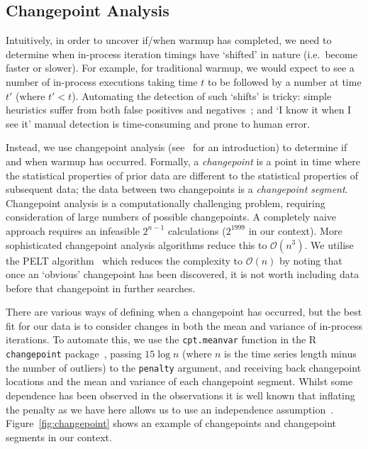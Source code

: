 \documentclass[acmsmall]{acmart}\settopmatter{printfolios=true}
\begin{document}
\subsection{Changepoint Analysis}

Intuitively, in order to uncover if/when warmup has completed, we need to
determine when in-process iteration timings have `shifted' in nature (i.e.~become
faster or slower). For example, for traditional warmup, we would expect to see a
number of in-process executions taking time $t$ to be followed by a number at
time $t'$ (where $t' < t$). Automating the detection of such `shifts' is
tricky: simple heuristics suffer from both false positives and negatives~\cite{kalibera13rigorous}; and
`I know it when I see it' manual detection is time-consuming and prone to human
error.

Instead, we use changepoint analysis (see~\citet{eckley11analysis} for an
introduction) to determine if and when warmup has occurred. Formally, a
\emph{changepoint} is a point in time where the statistical properties of prior
data are different to the statistical properties of subsequent data; the data
between two changepoints is a \emph{changepoint segment}.
Changepoint analysis is a computationally challenging problem, requiring
consideration of large numbers of possible changepoints. A completely naive
approach requires an infeasible $2^{n-1}$ calculations ($2^{1999}$ in our context).
More sophisticated changepoint analysis algorithms reduce this to $\mathcal{O}(n^3)$.
We utilise the PELT algorithm~\cite{killick12optimal} which reduces the
complexity to $\mathcal{O}(n)$ by noting that once an
`obvious' changepoint has been discovered, it is not worth including
data before that changepoint in further searches. 

There are various ways of defining when a changepoint has occurred, but the best fit
for our data is to consider changes in both the mean and variance of in-process
iterations. To automate this, we use the \texttt{cpt.meanvar} function in the R
\texttt{changepoint} package~\cite{killick14changepoint}, passing $15\log{n}$ (where
$n$ is the time series length minus the number of outliers) to the
\texttt{penalty} argument, and receiving back changepoint locations and the mean and variance
of each changepoint segment. Whilst some dependence has been observed in the observations it is 
well known that inflating the penalty as we have here allows us to use an independence 
assumption~\cite{antoch97effect}. Figure~\ref{fig:changepoint} shows an example of changepoints and
changepoint segments in our context.
\end{document}
